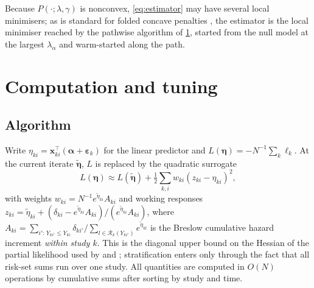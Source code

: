 \documentclass[11pt]{article}
\theoremstyle{remark}
\numberwithin{equation}{section}
\newcommand{\bx}{\mathbf{x}}
\newcommand{\balpha}{\boldsymbol{\alpha}}
\newcommand{\beps}{\boldsymbol{\varepsilon}}
\begin{document}
Because $P(\cdot;\lambda,\gamma)$ is nonconvex, \eqref{eq:estimator} may have
several local minimisers; as is standard for folded concave penalties
\citep{Fan2001, Zhang2010, FanXueZou2014}, the estimator is the local minimiser
reached by the pathwise algorithm of \cref{sec:computation}, started from the null
model at the largest $\lambda_\alpha$ and warm-started along the path.

\section{Computation and tuning}
\label{sec:computation}

\subsection{Algorithm}
\label{subsec:algorithm}

Write $\eta_{ki}=\bx_{ki}^\top(\balpha+\beps_k)$ for the linear predictor and
$L(\bm\eta)=-N^{-1}\sum_k\ell_k$. At the current iterate $\tilde{\bm\eta}$,
$L$ is replaced by the quadratic surrogate
\begin{equation}
  L(\bm\eta)\approx L(\tilde{\bm\eta})+\tfrac12\sum_{k,i}w_{ki}(z_{ki}-\eta_{ki})^2,
  \label{eq:surrogate}
\end{equation}
with weights $w_{ki}=N^{-1}e^{\tilde\eta_{ki}}A_{ki}$ and working responses
$z_{ki}=\tilde\eta_{ki}+(\delta_{ki}-e^{\tilde\eta_{ki}}A_{ki})/(e^{\tilde\eta_{ki}}A_{ki})$,
where $A_{ki}=\sum_{i':\,Y_{ki'}\le Y_{ki}}\delta_{ki'}/\sum_{l\in\mathcal R_k(Y_{ki'})}e^{\tilde\eta_{kl}}$
is the Breslow cumulative hazard increment \emph{within study $k$}. This is the
diagonal upper bound on the Hessian of the partial likelihood used by
\citet{Simon2011} and \citet{Breheny2011}; stratification enters only through
the fact that all risk-set sums run over one study. All quantities are computed
in $O(N)$ operations by cumulative sums after sorting by study and time.
\end{document}
